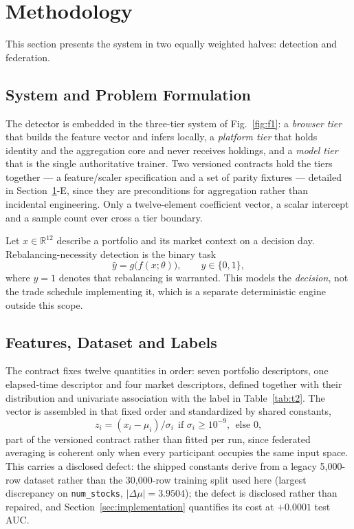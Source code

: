 \section{Methodology}\label{sec:methodology}

This section presents the system in two equally weighted halves: detection
and federation.

\subsection{System and Problem Formulation}

The detector is embedded in the three-tier system of Fig.~\ref{fig:f1}: a
\emph{browser tier} that builds the feature vector and infers locally, a
\emph{platform tier} that holds identity and the aggregation core and never
receives holdings, and a \emph{model tier} that is the single authoritative
trainer. Two versioned contracts hold the tiers together --- a feature/scaler
specification and a set of parity fixtures --- detailed in
Section~\ref{sec:methodology}-E, since they are preconditions for aggregation
rather than incidental engineering. Only a twelve-element coefficient vector,
a scalar intercept and a sample count ever cross a tier boundary.

Let $x\in\mathbb{R}^{12}$ describe a portfolio and its market context on a
decision day. Rebalancing-necessity detection is the binary task
\begin{equation}\label{eq:e1}
\hat{y} = g\bigl(f(x;\theta)\bigr),\qquad y\in\{0,1\},
\end{equation}
where $y=1$ denotes that rebalancing is warranted. This models the
\emph{decision}, not the trade schedule implementing it, which is a separate
deterministic engine outside this scope.

\subsection{Features, Dataset and Labels}

The contract fixes twelve quantities in order: seven portfolio descriptors, one
elapsed-time descriptor and four market descriptors, defined together with
their distribution and univariate association with the label in
Table~\ref{tab:t2}. The vector is assembled in that fixed order and
standardized by shared constants,
\begin{equation}\label{eq:e16}
z_i = (x_i - \mu_i)/\sigma_i \ \ \text{if } \sigma_i \geq 10^{-9}, \ \ \text{else } 0,
\end{equation}
part of the versioned contract rather than fitted per run, since federated
averaging is coherent only when every participant occupies the same input
space. This carries a disclosed defect: the shipped constants derive from a
legacy 5{,}000-row dataset rather than the 30{,}000-row training split used
here (largest discrepancy on \texttt{num\_stocks}, $|\Delta\mu|{=}3.9504$); the
defect is disclosed rather than repaired, and
Section~\ref{sec:implementation} quantifies its cost at $+0.0001$ test AUC.


